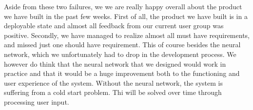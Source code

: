 Aside from these two failures, we we are really happy overall about the product we have built in the past few weeks.
First of all, the product we have built is in a deployable state and almost all feedback from our current user group was positive.
Secondly, we have managed to realize almost all must have requirements, and missed just one should have requirement.
This of course besides the neural network, which we unfortunately had to drop in the development process.
We however do think that the neural network that we designed would work in practice and that it would be a huge improvement both to the functioning and user experience of the system.%
Without the neural network, the system is suffering from a cold start problem.
Thi will be solved over time through processing user input.

